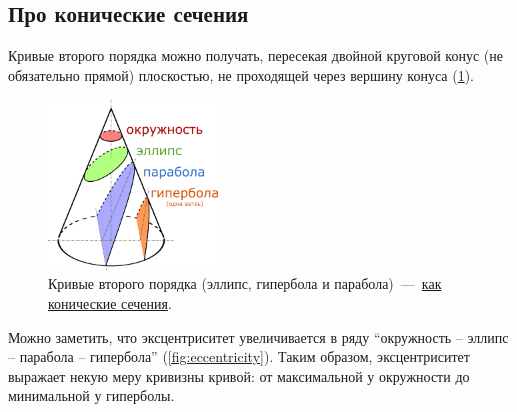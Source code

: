 \documentclass[a4paper,12pt]{article}
\begin{document}
  \subsection{Про конические сечения}
  
  Кривые второго порядка можно получать, пересекая двойной круговой конус (не обязательно прямой) плоскостью, не проходящей через вершину конуса (\ref{fig:conic_sections}).
  
  \begin{figure}[h]
    \centering
    
    \includegraphics[width=0.4\textwidth]{conic_sections}
    
    \caption{Кривые второго порядка (эллипс, гипербола и парабола)~---~\href{https://en.wikipedia.org/wiki/Conic_section}{как конические сечения}.}
    \label{fig:conic_sections}
  \end{figure}
  
  Можно заметить, что эксцентриситет увеличивается в ряду ``окружность -- эллипс -- парабола -- гипербола'' (\ref{fig:eccentricity}).
  Таким образом, эксцентриситет выражает некую меру кривизны кривой: от максимальной у окружности до минимальной у гиперболы.
\end{document}
